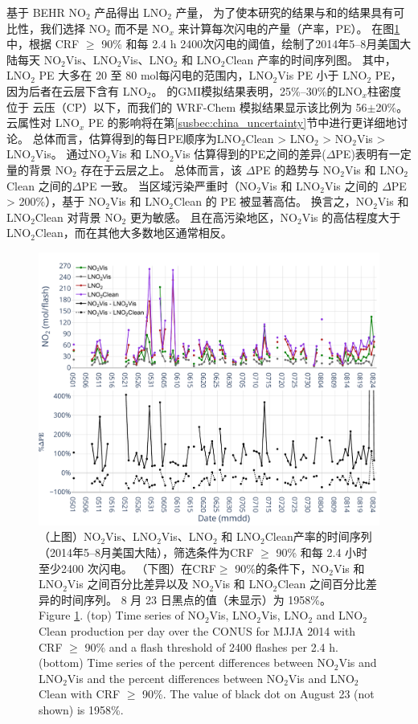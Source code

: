 \citet{Lapierre.2020}基于 BEHR NO$_2$ 产品得出 LNO$_2$ 产量，
为了使本研究的结果与\citet{Pickering.2016}和\citet{Lapierre.2020}的结果具有可比性，我们选择 NO$_2$  而不是 NO$_x$  来计算每次闪电的产量（产率，PE）。
在图\ref{fig:pe_timeseries}中，根据 CRF $\geq$ 90\% 和每 2.4 h 2400次闪电的阈值，绘制了2014年5--8月美国大陆每天 NO$_2$Vis、LNO$_2$Vis、LNO$_2$ 和 LNO$_2$Clean 产率的时间序列图。
其中，LNO$_2$ PE 大多在 20 至 80 mol每闪电的范围内，LNO$_2$Vis PE 小于 LNO$_2$ PE，因为后者在云层下含有 LNO$_2$。
\citet{Pickering.2016}的GMI模拟结果表明，25\%--30\%的LNO$_x$柱密度位于 云压（CP）以下，而我们的 WRF-Chem 模拟结果显示该比例为 56$\pm$20\%。
云属性对 LNO$_x$ PE 的影响将在第\ref{susbec:china_uncertainty}节中进行更详细地讨论。
总体而言，估算得到的每日PE顺序为LNO$_2$Clean > LNO$_2$ > NO$_2$Vis > LNO$_2$Vis。
通过NO$_2$Vis 和 LNO$_2$Vis 估算得到的PE之间的差异($\Delta$PE)表明有一定量的背景 NO$_2$ 存在于云层之上。
总体而言，该 $\Delta$PE 的趋势与 NO$_2$Vis 和 LNO$_2$Clean 之间的$\Delta$PE 一致。
当区域污染严重时（NO$_2$Vis 和 LNO$_2$Vis 之间的 $\Delta$PE > 200\%），基于 NO$_2$Vis 和 LNO$_2$Clean 的 PE 被显著高估。
换言之，NO$_2$Vis 和 LNO$_2$Clean 对背景 NO$_2$ 更为敏感。
且在高污染地区，NO$_2$Vis 的高估程度大于 LNO$_2$Clean，而在其他大多数地区通常相反。

\begin{figure}[h]
\centering
\includegraphics[width=12cm]{./figures/pe_timeseries.pdf}
\caption{（上图）NO$_2$Vis、LNO$_2$Vis、LNO$_2$ 和 LNO$_2$Clean产率的时间序列（2014年5--8月美国大陆），筛选条件为CRF $\geq$ 90\% 和每 2.4 小时 至少2400 次闪电。
（下图）在CRF$\geq$ 90\%的条件下，NO$_2$Vis 和 LNO$_2$Vis 之间百分比差异以及 NO$_2$Vis 和 LNO$_2$Clean 之间百分比差异的时间序列。
8 月 23 日黑点的值（未显示）为 1958\%。\\
Figure \ref{fig:pe_timeseries}. (top) Time series of NO$_2$Vis, LNO$_2$Vis, LNO$_2$ and LNO$_2$Clean production per day over the CONUS for MJJA 2014 with CRF $\geq$ 90\% and a flash threshold of 2400 flashes per 2.4 h.
(bottom) Time series of the percent differences between NO$_2$Vis and LNO$_2$Vis and the percent differences between NO$_2$Vis and LNO$_2$Clean with CRF $\geq$ 90\%.
The value of black dot on August 23 (not shown) is 1958\%.}
\label{fig:pe_timeseries}
\end{figure}

